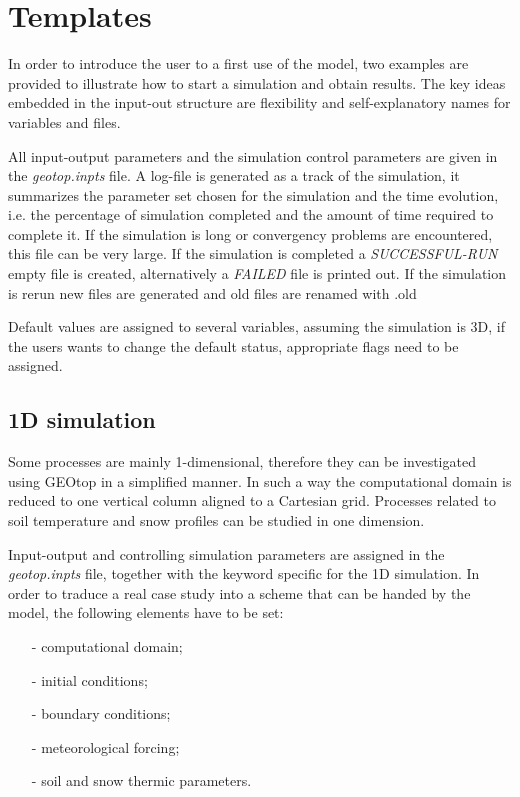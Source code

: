 \chapter{Templates}

In order to introduce the user to a first use of the model, two examples are provided to illustrate how to start a simulation and obtain results. The key ideas embedded in the input-out structure are flexibility and self-explanatory names for variables and files.

All input-output parameters and the simulation control parameters are given in the {\it geotop.inpts} file. A log-file is generated as a track of the simulation, it summarizes the parameter set chosen for the simulation and the time evolution, i.e. the percentage of simulation completed and the amount of time required to complete it. If the simulation is long or convergency problems are encountered, this file can be very large.
If the simulation is completed a  {\it SUCCESSFUL-RUN} empty file is created, alternatively a {\it FAILED} file is printed out.
If the simulation is rerun new files are generated and old files are renamed with .old

Default values are assigned to several variables, assuming the simulation is 3D, if the users wants to change the default status, appropriate flags need to be assigned.

\section{1D simulation}
Some processes are mainly 1-dimensional, therefore they can be investigated using GEOtop in a simplified manner. In such a way the computational domain is reduced to one vertical column aligned to a Cartesian grid.
Processes related to soil temperature and snow profiles can be studied in one dimension.

Input-output and controlling simulation parameters are assigned in the \emph{geotop.inpts} file, together with the keyword specific for the 1D simulation. In order to traduce a real case study into a scheme that can be handed by the model, the following elements have to be set:
\begin{itemize}
\item [-] computational domain;
\vspace{-0.2cm}
\item [-] initial conditions;
\vspace{-0.2cm}
\item [-] boundary conditions;
\vspace{-0.2cm}
\item [-] meteorological forcing;
\vspace{-0.2cm}
\item [-] soil and snow thermic parameters.
\end{itemize}

